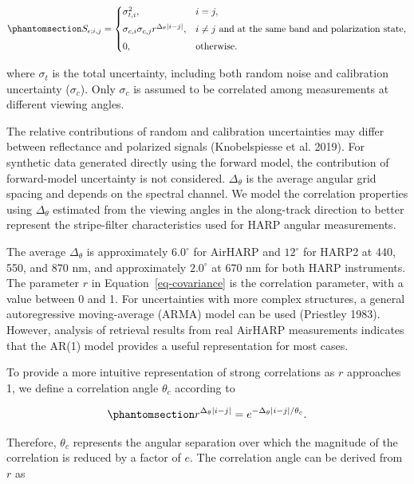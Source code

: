 \documentclass[
  letterpaper,
  open=any]{scrbook}
\begin{document}
\begin{equation}\phantomsection\label{eq-covariance}{
S_{\epsilon;i,j}
=
\begin{cases}
\sigma_{t,i}^2,
& i=j, \\[4pt]
\sigma_{c,i}\sigma_{c,j}
r^{\Delta_\theta |i-j|},
& i\ne j \text{ and at the same band and polarization state}, \\[4pt]
0,
& \text{otherwise}.
\end{cases}
}\end{equation}

where \(\sigma_t\) is the total uncertainty, including both random noise
and calibration uncertainty (\(\sigma_c\)). Only \(\sigma_c\) is assumed
to be correlated among measurements at different viewing angles.

The relative contributions of random and calibration uncertainties may
differ between reflectance and polarized signals (Knobelspiesse et al.
2019). For synthetic data generated directly using the forward model,
the contribution of forward-model uncertainty is not considered.
\(\Delta_\theta\) is the average angular grid spacing and depends on the
spectral channel. We model the correlation properties using
\(\Delta_\theta\) estimated from the viewing angles in the along-track
direction to better represent the stripe-filter characteristics used for
HARP angular measurements.

The average \(\Delta_\theta\) is approximately \(6.0^\circ\) for AirHARP
and \(12^\circ\) for HARP2 at 440, 550, and 870 nm, and approximately
\(2.0^\circ\) at 670 nm for both HARP instruments. The parameter \(r\)
in Equation~\ref{eq-covariance} is the correlation parameter, with a
value between 0 and 1. For uncertainties with more complex structures, a
general autoregressive moving-average (ARMA) model can be used
(Priestley 1983). However, analysis of retrieval results from real
AirHARP measurements indicates that the AR(1) model provides a useful
representation for most cases.

To provide a more intuitive representation of strong correlations as
\(r\) approaches 1, we define a correlation angle \(\theta_c\) according
to

\begin{equation}\phantomsection\label{eq-correlation-angle}{
r^{\Delta_\theta |i-j|}
=
e^{-\Delta_\theta |i-j|/\theta_c}.
}\end{equation}

Therefore, \(\theta_c\) represents the angular separation over which the
magnitude of the correlation is reduced by a factor of \(e\). The
correlation angle can be derived from \(r\) as
\end{document}
